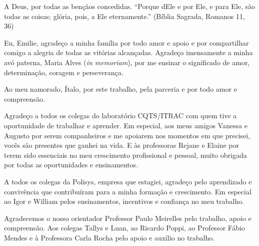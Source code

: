 \begin{agradecimentos}

A Deus, por todas as bençãos concedidas. ``Porque dEle e por Ele, e para Ele, são todas as coisas; glória, pois, a Ele eternamente.''
(Bíblia Sagrada, Romanos 11, 36)

Eu, Emilie, agradeço a minha família por todo amor e apoio e por compartilhar comigo a alegria de todas as vitórias alcançadas. 
Agradeço imensamente a minha avó paterna, Maria Alves (\textit{in memoriam}), por me ensinar o significado de amor, determinação, 
coragem e perseverança. 

Ao meu namorado, Ítalo, por este trabalho, pela parceria e por todo amor e compreensão.

Agradeço a todos os colegas do laboratório CQTS/ITRAC com quem tive a oportunidade de trabalhar e aprender. Em especial, aos meus amigos 
Vanessa e Augusto por serem companheiros e me apoiarem nos momentos em que precisei, vocês são presentes que ganhei 
na vida. E às professoras Rejane e Elaine por terem sido essenciais no meu crescimento profissional e pessoal, muito obrigada por  
todas as oportunidades e ensinamentos.

A todos os colegas da Polisys, empresa que estagiei, agradeço pelo aprendizado e convivência que contribuíram para a
minha formação e crescimento. Em especial ao Igor e William pelos ensinamentos, incentivos e confiança no meu trabalho.


Agradecemos o nosso orientador Professor Paulo Meirelles pelo trabalho, apoio e compreensão. Aos colegas Tallys e Luan, 
ao Ricardo Poppi, ao Professor Fábio Mendes e à Professora Carla Rocha pelo apoio e auxílio no trabalho.


\end{agradecimentos}
